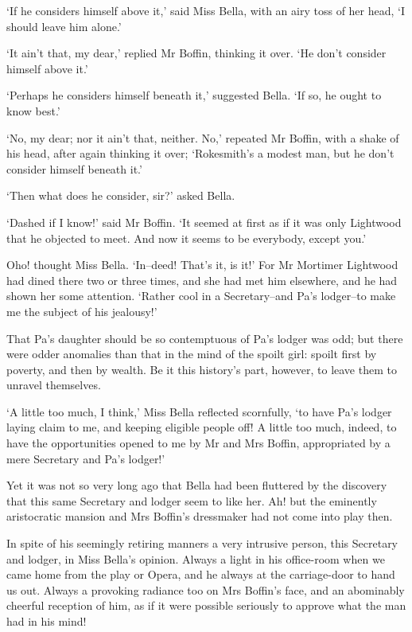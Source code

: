 ‘If he considers himself above it,’ said Miss Bella, with an airy toss
of her head, ‘I should leave him alone.’

‘It ain’t that, my dear,’ replied Mr Boffin, thinking it over. ‘He don’t
consider himself above it.’

‘Perhaps he considers himself beneath it,’ suggested Bella. ‘If so, he
ought to know best.’

‘No, my dear; nor it ain’t that, neither. No,’ repeated Mr Boffin, with
a shake of his head, after again thinking it over; ‘Rokesmith’s a modest
man, but he don’t consider himself beneath it.’

‘Then what does he consider, sir?’ asked Bella.

‘Dashed if I know!’ said Mr Boffin. ‘It seemed at first as if it
was only Lightwood that he objected to meet. And now it seems to be
everybody, except you.’

Oho! thought Miss Bella. ‘In--deed! That’s it, is it!’ For Mr Mortimer
Lightwood had dined there two or three times, and she had met him
elsewhere, and he had shown her some attention. ‘Rather cool in a
Secretary--and Pa’s lodger--to make me the subject of his jealousy!’

That Pa’s daughter should be so contemptuous of Pa’s lodger was odd;
but there were odder anomalies than that in the mind of the spoilt girl:
spoilt first by poverty, and then by wealth. Be it this history’s part,
however, to leave them to unravel themselves.

‘A little too much, I think,’ Miss Bella reflected scornfully, ‘to
have Pa’s lodger laying claim to me, and keeping eligible people off!
A little too much, indeed, to have the opportunities opened to me by Mr
and Mrs Boffin, appropriated by a mere Secretary and Pa’s lodger!’

Yet it was not so very long ago that Bella had been fluttered by the
discovery that this same Secretary and lodger seem to like her. Ah! but
the eminently aristocratic mansion and Mrs Boffin’s dressmaker had not
come into play then.

In spite of his seemingly retiring manners a very intrusive person, this
Secretary and lodger, in Miss Bella’s opinion. Always a light in his
office-room when we came home from the play or Opera, and he always at
the carriage-door to hand us out. Always a provoking radiance too on
Mrs Boffin’s face, and an abominably cheerful reception of him, as if it
were possible seriously to approve what the man had in his mind!


